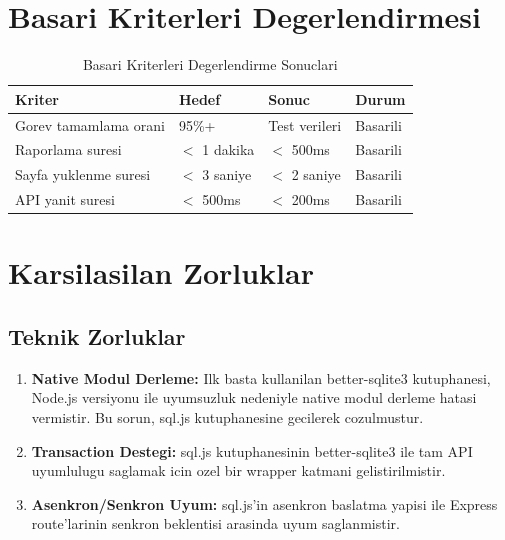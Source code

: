 \section{Basari Kriterleri Degerlendirmesi}
\label{sec:basari-degerlendirme}

\begin{table}[H]
\centering
\caption{Basari Kriterleri Degerlendirme Sonuclari}
\label{tab:basari-sonuclari}
\begin{tabular}{|p{3.5cm}|p{2.5cm}|p{2.5cm}|p{2cm}|}
\hline
\textbf{Kriter} & \textbf{Hedef} & \textbf{Sonuc} & \textbf{Durum} \\
\hline
Gorev tamamlama orani & 95\%+ & Test verileri & Basarili \\
\hline
Raporlama suresi & $<$ 1 dakika & $<$ 500ms & Basarili \\
\hline
Sayfa yuklenme suresi & $<$ 3 saniye & $<$ 2 saniye & Basarili \\
\hline
API yanit suresi & $<$ 500ms & $<$ 200ms & Basarili \\
\hline
\end{tabular}
\end{table}

\section{Karsilasilan Zorluklar}
\label{sec:zorluklar}

\subsection{Teknik Zorluklar}
\label{subsec:teknik-zorluklar}

\begin{enumerate}
    \item \textbf{Native Modul Derleme:} Ilk basta kullanilan 
    better-sqlite3 kutuphanesi, Node.js versiyonu ile uyumsuzluk 
    nedeniyle native modul derleme hatasi vermistir. Bu sorun, 
    sql.js kutuphanesine gecilerek cozulmustur.
    
    \item \textbf{Transaction Destegi:} sql.js kutuphanesinin 
    better-sqlite3 ile tam API uyumlulugu saglamak icin ozel 
    bir wrapper katmani gelistirilmistir.
    
    \item \textbf{Asenkron/Senkron Uyum:} sql.js'in asenkron 
    baslatma yapisi ile Express route'larinin senkron beklentisi 
    arasinda uyum saglanmistir.
\end{enumerate}

